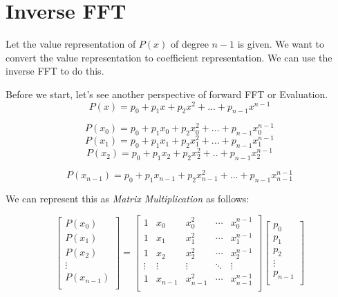 \documentclass[28]{report}
\begin{document}
\chapter{Inverse FFT}
Let the value representation of $P(x)$ of degree $n-1$  is given. We want to convert the value representation to coefficient representation. We can use the inverse FFT to do this. \newline

Before we start, let's see another perspective of forward FFT or Evaluation.
$$P(x) = p_0 + p_1x + p_2x^2 + ... + p_{n-1}x^{n-1}$$

$$ P(x_0) = p_0 + p_1x_0 + p_2x_0^2 + ... + p_{n-1}x_0^{n-1}$$
$$ P(x_1) = p_0 + p_1x_1 + p_2x_1^2 +... + p_{n-1}x_1^{n-1} $$
$$ P(x_2) = p_0 + p_1x_2 + p_2x_2^2 + .. + p_{n-1}x_2^{n-1} $$

$$ P(x_{n-1}) = p_0 + p_1x_{n-1} + p_2x_{n-1}^2 + ... + p_{n-1}x_{n-1}^{n-1} $$

We can represent this as \textit{Matrix Multiplication} as follows:

\begin{equation*}
	\begin{bmatrix}
					P(x_0) \\
				 P(x_1)\\
					P(x_2)\\
					\vdots \\
					P(x_{n-1}) \\
			\end{bmatrix}
			=
			\begin{bmatrix}
					1 & x_0 & x_0^2 & \cdots & x_0^{n-1} \\
					1 & x_1 & x_1^2 & \cdots & x_1^{n-1} \\
					1 & x_2 & x_2^2 & \cdots & x_2^{n-1} \\
					\vdots & \vdots & \vdots & \ddots & \vdots \\
					1 & x_{n-1} & x_{n-1}^2 & \cdots & x_{n-1}^{n-1} \\
			\end{bmatrix}
			\begin{bmatrix}
					p_0 \\
					p_1 \\
					p_2 \\
					\vdots \\
					p_{n-1} \\
			\end{bmatrix}
	\end{equation*}
\newline
\end{document}
